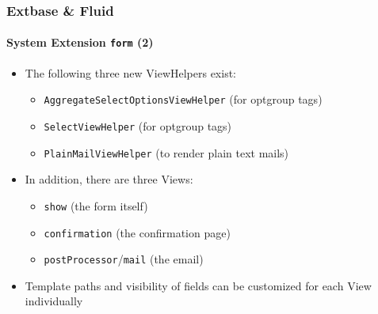
\begin{frame}[fragile]
	\frametitle{Extbase \& Fluid}
	\framesubtitle{System Extension \texttt{form} (2)}

	\begin{itemize}

		\item The following three new ViewHelpers exist:

			\begin{itemize}
				\item \texttt{AggregateSelectOptionsViewHelper} (for optgroup tags)
				\item \texttt{SelectViewHelper} (for optgroup tags)
				\item \texttt{PlainMailViewHelper} (to render plain text mails)
			\end{itemize}

		\item In addition, there are three Views:

			\begin{itemize}
				\item \texttt{show} (the form itself)
				\item \texttt{confirmation} (the confirmation page)
				\item \texttt{postProcessor}/\texttt{mail} (the email)
			\end{itemize}

		\item Template paths and visibility of fields can be customized
			for each View individually

	\end{itemize}

\end{frame}


